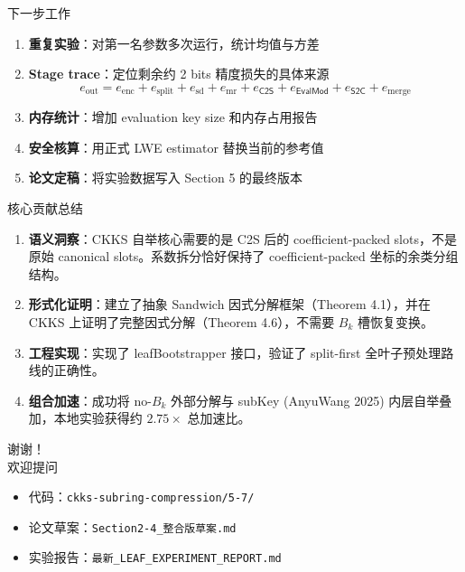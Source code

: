\documentclass[aspectratio=169, 10pt, xcolor=svgnames, table, UTF8]{ctexbeamer}
\newcommand{\cots}{\mathsf{C2S}}
\newcommand{\stoc}{\mathsf{S2C}}
\newcommand{\evalmod}{\mathsf{EvalMod}}
\begin{document}
\begin{frame}{下一步工作}
  \begin{enumerate}
    \item \textbf{重复实验}：对第一名参数多次运行，统计均值与方差
    
    \item \textbf{Stage trace}：定位剩余约 2 bits 精度损失的具体来源
    \[
    e_{\mathrm{out}} = e_{\mathrm{enc}} + e_{\mathrm{split}} + e_{\mathrm{sd}} + e_{\mathrm{mr}} + e_{\mathrm{\cots}} + e_{\mathrm{\evalmod}} + e_{\mathrm{\stoc}} + e_{\mathrm{merge}}
    \]
    
    \item \textbf{内存统计}：增加 evaluation key size 和内存占用报告
    
    \item \textbf{安全核算}：用正式 LWE estimator 替换当前的参考值
    
    \item \textbf{论文定稿}：将实验数据写入 Section 5 的最终版本
  \end{enumerate}
\end{frame}

\begin{frame}{核心贡献总结}
  \begin{enumerate}
    \item \textbf{语义洞察}：CKKS 自举核心需要的是 C2S 后的 coefficient-packed slots，不是原始 canonical slots。系数拆分恰好保持了 coefficient-packed 坐标的余类分组结构。
    
    \pause
    \item \textbf{形式化证明}：建立了抽象 Sandwich 因式分解框架（Theorem 4.1），并在 CKKS 上证明了完整因式分解（Theorem 4.6），不需要 \(B_k\) 槽恢复变换。
    
    \pause
    \item \textbf{工程实现}：实现了 leafBootstrapper 接口，验证了 split-first 全叶子预处理路线的正确性。
    
    \pause
    \item \textbf{组合加速}：成功将 no-\(B_k\) 外部分解与 subKey (AnyuWang 2025) 内层自举叠加，本地实验获得约 \(2.75\times\) 总加速比。
  \end{enumerate}
\end{frame}

\begin{frame}[plain]
  \centering
  \vspace{2cm}
  {\Huge 谢谢！}\\[1cm]
  {\Large 欢迎提问}\\[2cm]
  
  \begin{itemize}
    \item 代码：\texttt{ckks-subring-compression/5-7/}
    \item 论文草案：\texttt{Section2-4\_整合版草案.md}
    \item 实验报告：\texttt{最新\_LEAF\_EXPERIMENT\_REPORT.md}
  \end{itemize}
\end{frame}
\end{document}
